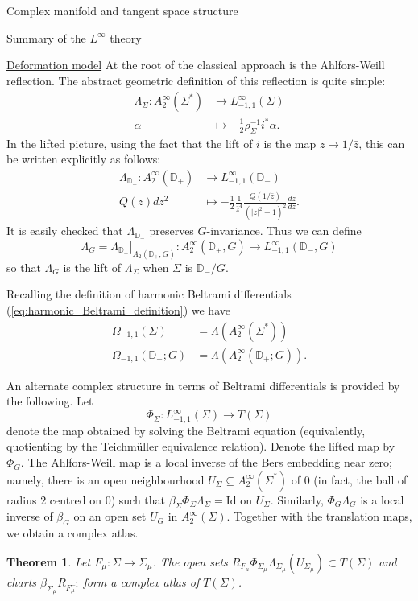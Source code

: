 \documentclass[12pt]{amsart}
\newcommand{\disk}{\ensuremath{\mathbb{D}} } %
\newcommand{\riem}{\Sigma}  %
\theoremstyle{plain}
\newtheorem{theorem}{Theorem}[section]
\theoremstyle{definition}
\theoremstyle{remark}
\numberwithin{equation}{section} %
\numberwithin{figure}{section} %
\begin{document}
\begin{section}{Complex manifold and tangent space structure}
\begin{subsection}{Summary of the $L^\infty$ theory}
\begin{subsubsection}{\underline{Deformation model}}
At the root of the classical approach is the Ahlfors-Weill reflection. The abstract geometric definition of this reflection is quite simple: 
\begin{align} 
 \Lambda_\riem:A_2^\infty(\riem^*) & \rightarrow L^\infty_{-1,1}(\riem) \nonumber \\
 \alpha & \mapsto - \frac{1}{2}  \rho_\riem^{-1} i^* \alpha.
\end{align} 
In the lifted picture, using the fact that the lift of $i$ is the map $z \mapsto 1/\bar{z}$, this can be written explicitly as follows:
\begin{align} \label{eq:Ahlfors_Weill_reflection_definition}
 \Lambda_{\disk_-}:A_2^\infty(\disk_+) & \rightarrow L^\infty_{-1,1}(\disk_-) \nonumber \\
 Q(z) dz^2 & \mapsto - \frac{1}{2} \frac{1}{\bar{z}^4} \frac{Q(1/\bar{z})}{(|z|^2-1)^2} \frac{d\bar{z}}{dz}.
\end{align} 
It is easily checked that $\Lambda_{\disk_-}$ preserves $G$-invariance. Thus we can define 
\[  \Lambda_G = \left. \Lambda_{\disk_-} \right|_{A_2(\disk_+,G)}: A_2^\infty(\disk_+,G) \rightarrow L_{-1,1}^\infty(\disk_-,G)   \]
so that $\Lambda_G$ is the lift of $\Lambda_\riem$ when $\riem$ is $\disk_-/G$.  


Recalling the definition of harmonic Beltrami differentials (\ref{eq:harmonic_Beltrami_definition}) we have 
\begin{align*}
 \Omega_{-1,1}(\riem) & = \Lambda(A_2^\infty(\riem^*)) \\
 \Omega_{-1,1}(\disk_-;G) & = \Lambda(A_2^\infty(\disk_+;G)).  
\end{align*} 

An alternate complex structure in terms of Beltrami differentials is provided by the following.  Let 
\[ \Phi_{\riem}:L^\infty_{-1,1}(\riem) \rightarrow T(\riem)  \]
denote the map obtained by solving the Beltrami equation (equivalently, quotienting by the Teichm\"uller equivalence relation). Denote the lifted map by $\Phi_G$.
The Ahlfors-Weill map is a local inverse of the Bers embedding near zero; namely, there is an open neighbourhood $U_\riem \subseteq A_2^\infty(\riem^*)$ of $0$ (in fact, the ball of radius $2$ centred on $0$) such that $\beta_{\riem} \Phi_\riem  \Lambda_{\riem} =\mathrm{Id}$ on $U_{\riem}$.  Similarly, $\Phi_G  \Lambda_G$ is a local inverse of $\beta_G$ on an open set $U_G$ in $A_2^\infty(\riem)$. Together with the translation maps, we obtain a complex atlas.   
\begin{theorem}  
 Let $F_\mu: \riem \rightarrow \riem_\mu$. 
 The open sets $R_{F_\mu} \Phi_{\riem_\mu} \Lambda_{\riem_\mu} (U_{\riem_\mu}) \subset T(\riem)$ and charts $\beta_{\riem_\mu}  R_{F_\mu^{-1}}$ form a complex atlas of $T(\riem)$. 


\end{theorem}
\end{subsubsection}
\end{subsection}
\end{section}
\end{document}
